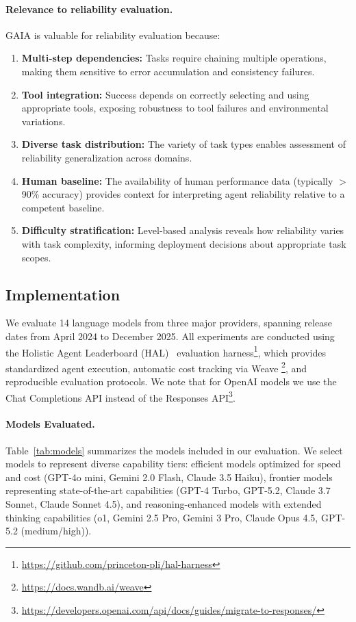 \documentclass[11pt]{article}
\begin{document}
\paragraph{Relevance to reliability evaluation.}
GAIA is valuable for reliability evaluation because:
\begin{enumerate}[leftmargin=*, topsep=2pt]
    \item \textbf{Multi-step dependencies:} Tasks require chaining multiple operations, making them sensitive to error accumulation and consistency failures.
    \item \textbf{Tool integration:} Success depends on correctly selecting and using appropriate tools, exposing robustness to tool failures and environmental variations.
    \item \textbf{Diverse task distribution:} The variety of task types enables assessment of reliability generalization across domains.
    \item \textbf{Human baseline:} The availability of human performance data (typically $>$90\% accuracy) provides context for interpreting agent reliability relative to a competent baseline.
    \item \textbf{Difficulty stratification:} Level-based analysis reveals how reliability varies with task complexity, informing deployment decisions about appropriate task scopes.
\end{enumerate}


\subsection{Implementation}
\label{appendix:implementation}

We evaluate 14 language models from three major providers, spanning release dates from April 2024 to December 2025. All experiments are conducted using the Holistic Agent Leaderboard (HAL)~\citep{kapoor2025holistic} evaluation harness\footnote{\url{https://github.com/princeton-pli/hal-harness}}, which provides standardized agent execution, automatic cost tracking via Weave \footnote{\url{https://docs.wandb.ai/weave}}, and reproducible evaluation protocols. We note that for OpenAI models we use the Chat Completions API instead of the Responses API\footnote{\url{https://developers.openai.com/api/docs/guides/migrate-to-responses/}}.

\paragraph{Models Evaluated.} Table~\ref{tab:models} summarizes the models included in our evaluation. We select models to represent diverse capability tiers: efficient models optimized for speed and cost (GPT-4o mini, Gemini 2.0 Flash, Claude 3.5 Haiku), frontier models representing state-of-the-art capabilities (GPT-4 Turbo, GPT-5.2, Claude 3.7 Sonnet, Claude Sonnet 4.5), and reasoning-enhanced models with extended thinking capabilities (o1, Gemini 2.5 Pro, Gemini 3 Pro, Claude Opus 4.5, GPT-5.2 (medium/high)).
\end{document}
